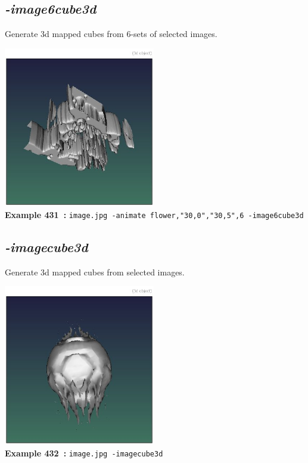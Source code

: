 \documentclass[a4paper,11pt,twoside]{book}
\begin{document}
\subsection{\emph{-image6cube3d} }\vspace*{-0.5em}
Generate 3d mapped cubes from 6-sets of selected images.
\begin{center}\includegraphics[keepaspectratio=true,height=7cm,width=\textwidth]{img/gmic_def431.jpg}\\
{\footnotesize \textbf{Example 431~:} \texttt{image.jpg -animate flower,"30,0","30,5",6 -image6cube3d}}
\end{center}

\subsection{\emph{-imagecube3d} }\vspace*{-0.5em}
Generate 3d mapped cubes from selected images.
\begin{center}\includegraphics[keepaspectratio=true,height=7cm,width=\textwidth]{img/gmic_def432.jpg}\\
{\footnotesize \textbf{Example 432~:} \texttt{image.jpg -imagecube3d}}
\end{center}
\end{document}
